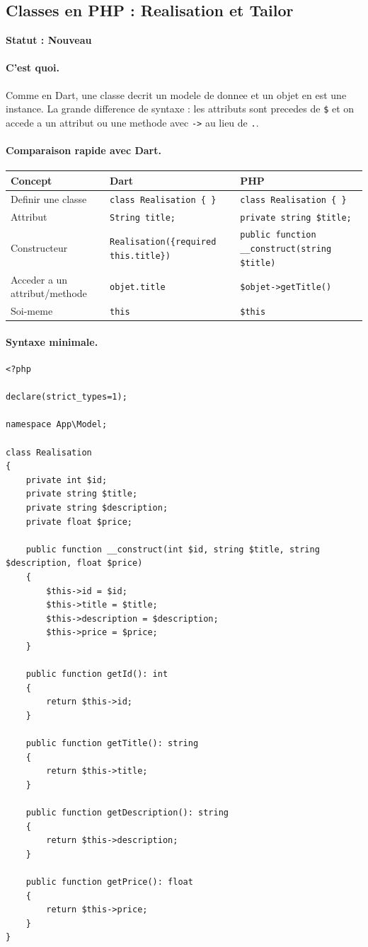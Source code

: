 \documentclass[11pt,a4paper]{article}
\newcommand{\statut}[1]{\textbf{Statut : #1}}
\begin{document}
\subsection{Classes en PHP : Realisation et Tailor}

\statut{Nouveau}

\paragraph{C'est quoi.}
Comme en Dart, une classe decrit un modele de donnee et un objet en est une
instance. La grande difference de syntaxe : les attributs sont precedes de
\verb|$| et on accede a un attribut ou une methode avec \verb|->| au lieu de
\verb|.|.

\paragraph{Comparaison rapide avec Dart.}

\begin{longtable}{|p{4cm}|p{5cm}|p{5cm}|}
\hline
\textbf{Concept} & \textbf{Dart} & \textbf{PHP} \\
\hline
Definir une classe & \verb|class Realisation { }| & \verb|class Realisation { }| \\
\hline
Attribut & \verb|String title;| & \verb|private string $title;| \\
\hline
Constructeur & \verb|Realisation({required this.title})| & \verb|public function __construct(string $title)| \\
\hline
Acceder a un attribut/methode & \verb|objet.title| & \verb|$objet->getTitle()| \\
\hline
Soi-meme & \verb|this| & \verb|$this| \\
\hline
\end{longtable}

\paragraph{Syntaxe minimale.}

\begin{lstlisting}
<?php

declare(strict_types=1);

namespace App\Model;

class Realisation
{
    private int $id;
    private string $title;
    private string $description;
    private float $price;

    public function __construct(int $id, string $title, string $description, float $price)
    {
        $this->id = $id;
        $this->title = $title;
        $this->description = $description;
        $this->price = $price;
    }

    public function getId(): int
    {
        return $this->id;
    }

    public function getTitle(): string
    {
        return $this->title;
    }

    public function getDescription(): string
    {
        return $this->description;
    }

    public function getPrice(): float
    {
        return $this->price;
    }
}
\end{lstlisting}
\end{document}
